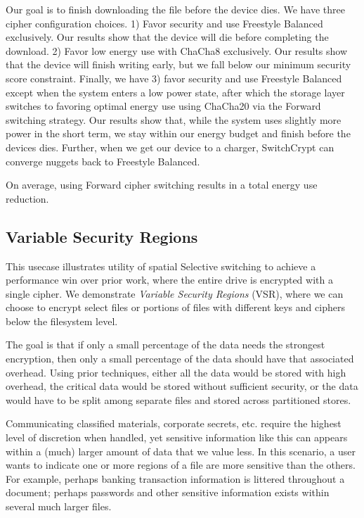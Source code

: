 Our goal is to finish downloading the file before the device dies. We have three
cipher configuration choices. 1) Favor security and use Freestyle Balanced
exclusively. Our results show that the device will die before completing the
download. 2) Favor low energy use with ChaCha8 exclusively. Our results show
that the device will finish writing early, but we fall below our minimum
security score constraint. Finally, we have 3) favor security and use Freestyle
Balanced except when the system enters a low power state, after which the
storage layer switches to favoring optimal energy use using ChaCha20 via the
Forward switching strategy. Our results show that, while the system uses
slightly more power in the short term, we stay within our energy budget and
finish before the devices dies. Further, when we get our device to a charger,
SwitchCrypt can converge nuggets back to Freestyle Balanced.

On average, using Forward cipher switching results in a  total energy
use reduction.

\subsection{Variable Security Regions}

This usecase illustrates utility of spatial Selective switching to achieve a
performance win over prior work, where the entire drive is encrypted with a
single cipher. We demonstrate \emph{Variable Security Regions} (VSR), where we
can choose to encrypt select files or portions of files with different keys and
ciphers below the filesystem level.

The goal is that if only a small percentage of the data needs the strongest
encryption, then only a small percentage of the data should have that associated
overhead.  Using prior techniques, either all the data would be stored with high
overhead, the critical data would be stored without sufficient security, or the
data would have to be split among separate files and stored across partitioned
stores.

Communicating classified materials, corporate secrets, etc. require the highest
level of discretion when handled, yet sensitive information like this can
appears within a (much) larger amount of data that we value less. In this
scenario, a user wants to indicate one or more regions of a file are more
sensitive than the others. For example, perhaps banking transaction information
is littered throughout a document; perhaps passwords and other sensitive
information exists within several much larger files.

